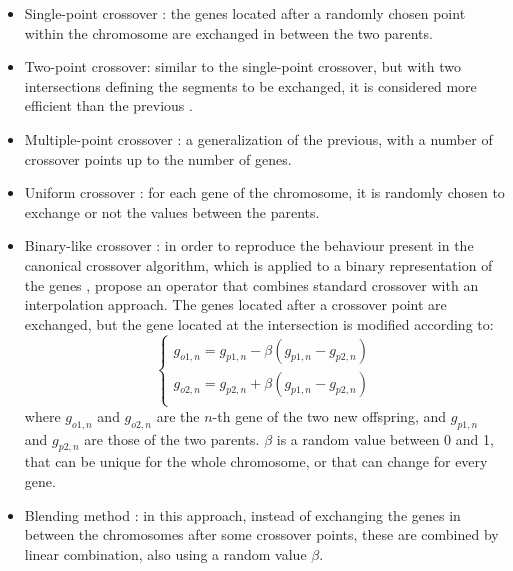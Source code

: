 \documentclass{ametsoc}
\begin{document}
\begin{itemize}
	\item Single-point crossover \citep{Goldberg1989}: the genes located after a randomly chosen point within the chromosome are exchanged in between the two parents.
	
	\item Two-point crossover: similar to the single-point crossover, but with two intersections defining the segments to be exchanged, it is considered more efficient than the previous \citep{Beasley1993a}.
	
	\item Multiple-point crossover \citep{DeJong1975a}: a generalization of the previous, with a number of crossover points up to the number of genes.
	
	\item Uniform crossover \citep{Syswerda1989}: for each gene of the chromosome, it is randomly chosen to exchange or not the values between the parents.
	
	\item Binary-like crossover \citep{Haupt2004}: in order to reproduce the behaviour present in the canonical crossover algorithm, which is applied to a binary representation of the genes \citep{Goldberg1989, Goldberg1990a, Herrera1998a}, \citet{Haupt2004} propose an operator that combines standard crossover with an interpolation approach. The genes located after a crossover point are exchanged, but the gene located at the intersection is modified according to:
	\begin{equation}
	\left\lbrace \begin{array}{l} 
	g_{o1,n} = g_{p1,n} - \beta (g_{p1,n} - g_{p2,n}) \\
	g_{o2,n} = g_{p2,n} + \beta (g_{p1,n} - g_{p2,n}) \\
	\end{array} \right.
	\label{equation_mating_as_binary}
	\end{equation}
	where $g_{o1,n}$ and $g_{o2,n}$ are the $n$-th gene of the two new offspring, and $g_{p1,n}$ and $g_{p2,n}$ are those of the two parents. $\beta$ is a random value between 0 and 1, that can be unique for the whole chromosome, or that can change for every gene.
	
	\item Blending method \citep{Radcliffe1991a}: in this approach, instead of exchanging the genes in between the chromosomes after some crossover points, these are combined by linear combination, also using a random value $\beta$.
	

\end{itemize}
\end{document}
